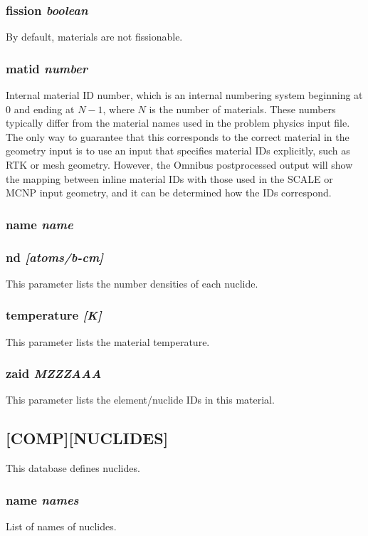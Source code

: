 \documentclass[10pt]{article}
\begin{document}
\subsubsection{fission \textit{boolean}}
By default, materials are not fissionable. 

\subsubsection{matid \textit{number}}
Internal material ID number, which is an internal numbering system beginning at 0 and ending at \(N-1\), where \(N\) is the number of materials. These numbers typically differ from the material names used in the problem physics input file. The only way to guarantee that this corresponds to the correct material in the geometry input is to use an input that specifies material IDs explicitly, such as RTK or mesh geometry. However, the Omnibus postprocessed output will show the mapping between inline material IDs with those used in the SCALE or MCNP input geometry, and it can be determined how the IDs correspond. 

\subsubsection{name \textit{name}}

\subsubsection{nd \textit{[atoms/b-cm]}}
This parameter lists the number densities of each nuclide. 

\subsubsection{temperature \textit{[K]}}
This parameter lists the material temperature. 

\subsubsection{zaid \textit{MZZZAAA}}
This parameter lists the element/nuclide IDs in this material.

\subsection{[COMP][NUCLIDES]}
This database defines nuclides.

\subsubsection{name \textit{names}}
List of names of nuclides.
\end{document}
